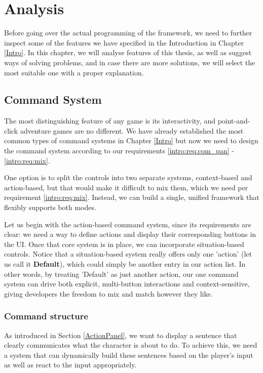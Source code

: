\chapter{Analysis}

Before going over the actual programming of the framework, we need to further inspect some of the features we have specified in the Introduction in Chapter \ref{Intro}. In this chapter, we will analyse features of this thesis, as well as suggest ways of solving problems, and in case there are more solutions, we will select the most suitable one with a proper explanation.

\section{Command System}
The most distinguishing feature of any game is its interactivity, and point-and-click adventure games are no different. We have already established the most common types of command systems in Chapter \ref{Intro} but now we need to design the command system according to our requirements \ref{intro:req:com_pan} - \ref{intro:req:mix}. 

One option is to split the controls into two separate systems, context-based and action-based, but that would make it difficult to mix them, which we need per requirement \ref{intro:req:mix}. Instead, we can build a single, unified framework that flexibly supports both modes.

Let us begin with the action-based command system, since its requirements are clear: we need a way to define actions and display their corresponding buttons in the UI. Once that core system is in place, we can incorporate situation-based controls. Notice that a situation-based system really offers only one 'action' (let us call it \textbf{Default}), which could simply be another entry in our action list. In other words, by treating 'Default' as just another action, our one command system can drive both explicit, multi-button interactions and context-sensitive, giving developers the freedom to mix and match however they like.

\subsection{Command structure}
\label{Analysis:CommandStructure}
As introduced in Section \ref{ActionPanel}, we want to display a sentence that clearly communicates what the character is about to do. To achieve this, we need a system that can dynamically build these sentences based on the player's input as well as react to the input appropriately.


